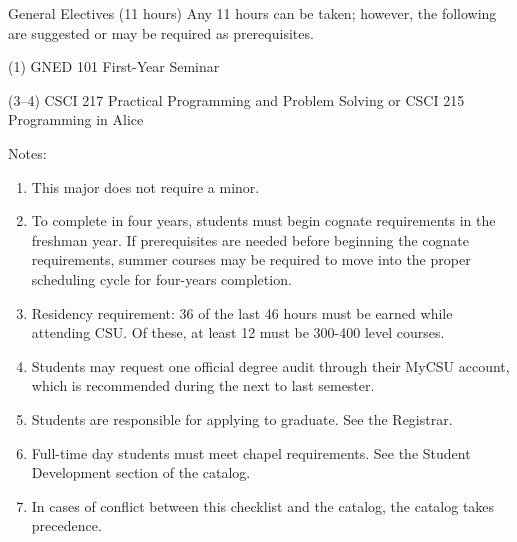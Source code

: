 \begin{reqgroup}{General Electives (11 hours)}
Any 11 hours can be taken; however, the following are suggested or may be required as prerequisites.
\begin{checklist}
\begin{minipage}[t]{\linewidth}
	\item (1)	GNED 101	First-Year Seminar
	\item (3--4)	CSCI 217	Practical Programming and Problem Solving or CSCI 215	Programming in Alice\\
	\begin{minipage}[t]{0.5\linewidth}
		\blankReq
	\end{minipage}
	\begin{minipage}[t]{0.5\linewidth}
		\blankReq
	\end{minipage}
\end{minipage}
\end{checklist}
\end{reqgroup}

Notes:%
\begin{enumerate}\footnotesize
	\item This major does not require a minor.
	\item To complete in four years, students must begin cognate requirements in the freshman year. If prerequisites are needed before beginning the cognate requirements, summer courses may be required to move into the proper scheduling cycle for four-years completion.
	\item Residency requirement: 36 of the last 46 hours must be earned while attending CSU. Of these, at least 12 must be 300-400 level courses.
	\item Students may request one official degree audit through their MyCSU account, which is recommended during the next to last semester.
	\item Students are responsible for applying to graduate. See the Registrar.
	\item Full-time day students must meet chapel requirements. See the Student Development section of the catalog.
	\item In cases of conflict between this checklist and the catalog, the catalog takes precedence.
\end{enumerate}